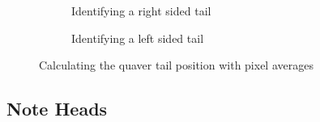 \begin{figure}[h!]
    \centering

    \begin{subfigure}[b]{.45\linewidth}
        \centering
      \caption{Identifying a right sided tail}
      \label{fig:quaver-tail-average-position-right}
    \end{subfigure}
    \begin{subfigure}[b]{.45\linewidth}
        \centering
      \caption{Identifying a left sided tail}
      \label{fig:quaver-tail-average-position-left}
    \end{subfigure}

      \caption{Calculating the quaver tail position with pixel averages}
      \label{fig:quaver-tail-average-position}
\end{figure}

\subsection{Note Heads}
